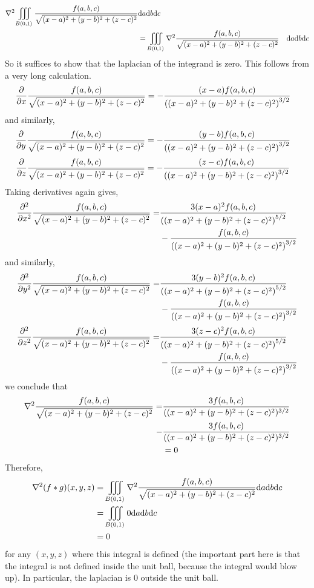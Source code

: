 \documentclass[12pt]{article}
\theoremstyle{definition}
\theoremstyle{remark}
\begin{document}
\begin{enumerate}[leftmargin=\labelsep]
\begin{align*}
			\laplacian{\iiint_{B(0, 1)} \frac{f(a, b, c)}{\sqrt{(x-a)^2+(y-b)^2+(z-c)^2}}&\dd a\dd b\dd c} \\
			&= \iiint_{B(0, 1)} \laplacian{\frac{f(a, b, c)}{\sqrt{(x-a)^2+(y-b)^2+(z-c)^2}}}&\dd a\dd b\dd c
		\end{align*}
		So it suffices to show that the laplacian of the integrand is zero. This follows from a very long calculation.
		\begin{align*}
			\pdv{x}\frac{f(a, b, c)}{\sqrt{(x-a)^2+(y-b)^2+(z-c)^2}} &= -\frac{(x-a)f(a, b,c)}{\qty((x-a)^2+(y-b)^2+(z-c)^2)^{3/2}}
		\end{align*}
		and similarly,
		\begin{align*}
			\pdv{y}\frac{f(a, b, c)}{\sqrt{(x-a)^2+(y-b)^2+(z-c)^2}} &= -\frac{(y-b)f(a, b,c)}{\qty((x-a)^2+(y-b)^2+(z-c)^2)^{3/2}}
		\end{align*}
		\begin{align*}
			\pdv{z}\frac{f(a, b, c)}{\sqrt{(x-a)^2+(y-b)^2+(z-c)^2}} &= -\frac{(z-c)f(a, b,c)}{\qty((x-a)^2+(y-b)^2+(z-c)^2)^{3/2}}
		\end{align*}
		Taking derivatives again gives,
		\begin{align*}
			\pdv[2]{x} \frac{f(a, b, c)}{\sqrt{(x-a)^2+(y-b)^2+(z-c)^2}} =& \frac{3(x-a)^2f(a,b,c)}{\qty((x-a)^2+(y-b)^2+(z-c)^2)^{5/2}} \\
			&-\frac{f(a,b,c)}{\qty((x-a)^2+(y-b)^2+(z-c)^2)^{3/2}}
		\end{align*}
		and similarly,
		\begin{align*}
			\pdv[2]{y} \frac{f(a, b, c)}{\sqrt{(x-a)^2+(y-b)^2+(z-c)^2}} =& \frac{3(y-b)^2f(a,b,c)}{\qty((x-a)^2+(y-b)^2+(z-c)^2)^{5/2}} \\
			&-\frac{f(a,b,c)}{\qty((x-a)^2+(y-b)^2+(z-c)^2)^{3/2}}
		\end{align*}
		\begin{align*}
			\pdv[2]{z} \frac{f(a, b, c)}{\sqrt{(x-a)^2+(y-b)^2+(z-c)^2}} =& \frac{3(z-c)^2f(a,b,c)}{\qty((x-a)^2+(y-b)^2+(z-c)^2)^{5/2}} \\
			&-\frac{f(a,b,c)}{\qty((x-a)^2+(y-b)^2+(z-c)^2)^{3/2}}
		\end{align*}
		we conclude that
		\begin{align*}
			\laplacian{\frac{f(a, b, c)}{\sqrt{(x-a)^2+(y-b)^2+(z-c)^2}}} = &\frac{3f(a,b,c)}{((x-a)^2+(y-b)^2+(z-c)^2)^{3/2}} \\- &\frac{3f(a,b,c)}{((x-a)^2+(y-b)^2+(z-c)^2)^{3/2}}\\
			&= 0
		\end{align*}
		Therefore, 
		\begin{align*}
			\laplacian{(f * g)(x, y,z)} &= \iiint_{B(0, 1)} \laplacian{\frac{f(a, b, c)}{\sqrt{(x-a)^2+(y-b)^2+(z-c)^2}}} \dd a \dd b \dd c \\
			&= \iiint_{B(0, 1)} 0 \dd a \dd b \dd c \\
			&= 0
		\end{align*}
		for any $(x, y, z)$ where this integral is defined (the important part here is that the integral is not defined inside the unit ball, because the integral would blow up). In particular, the laplacian is 0 outside the unit ball.
		

\end{enumerate}
\end{document}
